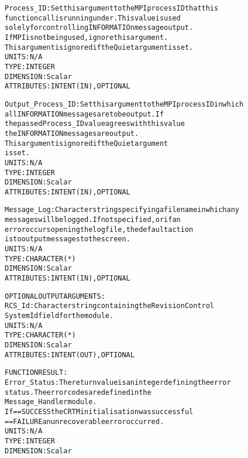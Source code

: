 \begin{alltt}
        Process_ID:         Set this argument to the MPI process ID that this
                            function call is running under. This value is used
                            solely for controlling INFORMATIOn message output.
                            If MPI is not being used, ignore this argument.
                            This argument is ignored if the Quiet argument is set.
                            UNITS:      N/A
                            TYPE:       INTEGER
                            DIMENSION:  Scalar
                            ATTRIBUTES: INTENT(IN), OPTIONAL
 
        Output_Process_ID:  Set this argument to the MPI process ID in which
                            all INFORMATION messages are to be output. If
                            the passed Process_ID value agrees with this value
                            the INFORMATION messages are output. 
                            This argument is ignored if the Quiet argument
                            is set.
                            UNITS:      N/A
                            TYPE:       INTEGER
                            DIMENSION:  Scalar
                            ATTRIBUTES: INTENT(IN), OPTIONAL
 
        Message_Log:        Character string specifying a filename in which any
                            messages will be logged. If not specified, or if an
                            error occurs opening the log file, the default action
                            is to output messages to the screen.
                            UNITS:      N/A
                            TYPE:       CHARACTER(*)
                            DIMENSION:  Scalar
                            ATTRIBUTES: INTENT(IN), OPTIONAL
 
  OPTIONAL OUTPUT ARGUMENTS:
        RCS_Id:             Character string containing the Revision Control
                            System Id field for the module.
                            UNITS:      N/A
                            TYPE:       CHARACTER(*)
                            DIMENSION:  Scalar
                            ATTRIBUTES: INTENT(OUT), OPTIONAL
 
  FUNCTION RESULT:
        Error_Status:       The return value is an integer defining the error
                            status. The error codes are defined in the
                            Message_Handler module.
                            If == SUCCESS the CRTM initialisation was successful
                               == FAILURE an unrecoverable error occurred.
                            UNITS:      N/A
                            TYPE:       INTEGER
                            DIMENSION:  Scalar
 

\end{alltt}
